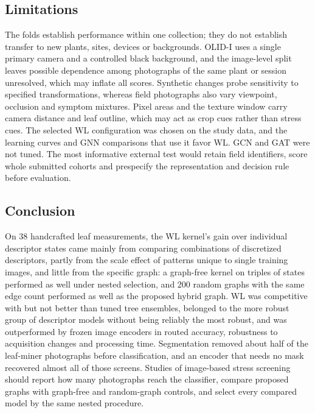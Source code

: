 \subsection{Limitations}
The folds establish performance within one collection; they do not establish transfer to new plants, sites, devices or backgrounds. OLID-I uses a single primary camera and a controlled black background, and the image-level split leaves possible dependence among photographs of the same plant or session unresolved, which may inflate all scores. Synthetic changes probe sensitivity to specified transformations, whereas field photographs also vary viewpoint, occlusion and symptom mixtures. Pixel areas and the texture window carry camera distance and leaf outline, which may act as crop cues rather than stress cues. The selected WL configuration was chosen on the study data, and the learning curves and GNN comparisons that use it favor WL. GCN and GAT were not tuned. The most informative external test would retain field identifiers, score whole submitted cohorts and prespecify the representation and decision rule before evaluation.

\subsection{Conclusion}
On 38 handcrafted leaf measurements, the WL kernel's gain over individual descriptor states came mainly from comparing combinations of discretized descriptors, partly from the scale effect of patterns unique to single training images, and little from the specific graph: a graph-free kernel on triples of states performed as well under nested selection, and 200 random graphs with the same edge count performed as well as the proposed hybrid graph. WL was competitive with but not better than tuned tree ensembles, belonged to the more robust group of descriptor models without being reliably the most robust, and was outperformed by frozen image encoders in routed accuracy, robustness to acquisition changes and processing time. Segmentation removed about half of the leaf-miner photographs before classification, and an encoder that needs no mask recovered almost all of those screens. Studies of image-based stress screening should report how many photographs reach the classifier, compare proposed graphs with graph-free and random-graph controls, and select every compared model by the same nested procedure.

